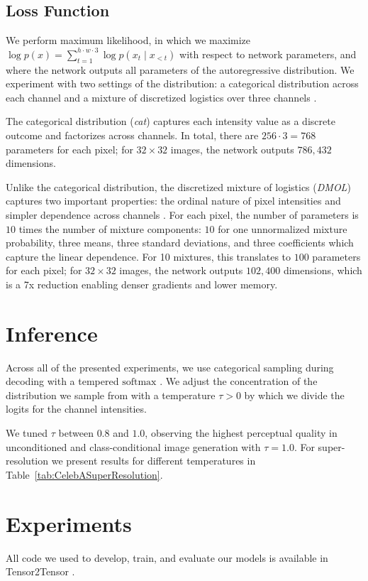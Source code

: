 \documentclass{article}
\begin{document}
\subsection{Loss Function}
\label{sub:loss}

We perform maximum likelihood, in which we maximize $\log p(x) = \sum_{t=1}^{h\cdot w\cdot 3} \log p(x_t\mid x_{<t})$ with respect to network parameters, and where the
network outputs all parameters of the autoregressive distribution.
We experiment with two settings of the distribution: a categorical distribution across each channel \citep{PixelRNN} and a mixture of discretized logistics over three channels \citep{PixelCNNpp}.

The categorical distribution (\emph{cat}) captures each intensity value as a discrete outcome and factorizes across channels. In total, there are $256\cdot 3=768$ parameters for each pixel; for $32\times 32$ images, the network outputs $786,432$ dimensions.


Unlike the categorical distribution, the discretized mixture of logistics (\emph{DMOL}) captures two important properties: the ordinal nature of pixel intensities and simpler dependence across channels \citep{PixelCNNpp}.
For each pixel, the number of parameters is $10$ times the number of mixture components: $10$ for one unnormalized mixture probability, three means,
three standard deviations,
and three coefficients 
which capture the linear dependence.
For 10 mixtures, this translates to $100$ parameters for each pixel; for $32\times 32$ images, the network outputs $102,400$ dimensions, which is a 7x reduction enabling denser gradients and lower memory.
 
\section{Inference}
Across all of the presented experiments, we use categorical sampling during decoding with a tempered $\mathrm{softmax}$ \citep{PixelRecursiveSuperResolution}. We adjust the concentration of the distribution we sample from with a temperature $\tau > 0$ by which we divide the logits for the channel intensities.

We tuned $\tau$ between $0.8$ and $1.0$, observing the highest perceptual quality in unconditioned and class-conditional image generation with  $\tau=1.0$.
For super-resolution we present results for different temperatures in Table~\ref{tab:CelebASuperResolution}.
 
\section{Experiments}
All code we used to develop, train, and evaluate our models is available in Tensor2Tensor \citep{tensor2tensor}.
\end{document}
